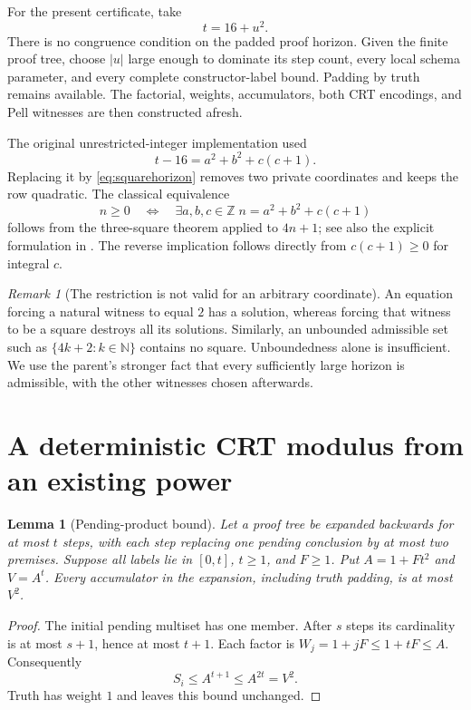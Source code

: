 \documentclass[11pt]{article}
\newcommand{\Z}{\mathbb Z}\newcommand{\N}{\mathbb N}
\newtheorem{lemma}[theorem]{Lemma}
\theoremstyle{definition}\newtheorem{definition}[theorem]{Definition}
\theoremstyle{remark}\newtheorem{remark}[theorem]{Remark}
\begin{document}
For the present certificate, take
\[
 t=16+u^2. \tag{6}\label{eq:squarehorizon}
\]
There is no congruence condition on the padded proof horizon. Given the finite
proof tree, choose $|u|$ large enough to dominate its step count, every local
schema parameter, and every complete constructor-label bound. Padding by
truth remains available. The factorial, weights, accumulators, both CRT
encodings, and Pell witnesses are then constructed afresh.

The original unrestricted-integer implementation used
\[
 t-16=a^2+b^2+c(c+1).
\]
Replacing it by \eqref{eq:squarehorizon} removes two private coordinates and
keeps the row quadratic. The classical equivalence
\[
 n\ge0\quad\Longleftrightarrow\quad
 \exists a,b,c\in\Z\;n=a^2+b^2+c(c+1)
 \tag{7}\label{eq:three}
\]
follows from the three-square theorem applied to $4n+1$; see also the explicit
formulation in \cite[Lemma 6.1]{bayer}. The reverse implication follows
directly from $c(c+1)\ge0$ for integral $c$.

\begin{remark}[The restriction is not valid for an arbitrary coordinate]
An equation forcing a natural witness to equal $2$ has a solution, whereas
forcing that witness to be a square destroys all its solutions. Similarly,
an unbounded admissible set such as $\{4k+2:k\in\N\}$ contains no square.
Unboundedness alone is insufficient. We use the parent's stronger fact that
every sufficiently large horizon is admissible, with the other witnesses
chosen afterwards.
\end{remark}

\section{A deterministic CRT modulus from an existing power}
\label{sec:modulus}

\begin{lemma}[Pending-product bound]
Let a proof tree be expanded backwards for at most $t$ steps, with each
step replacing one pending conclusion by at most two premises. Suppose all
labels lie in $[0,t]$, $t\ge1$, and $F\ge1$. Put
$A=1+Ft^2$ and $V=A^t$. Every accumulator in the expansion, including
truth padding, is at most $V^2$.
\end{lemma}
\begin{proof}
The initial pending multiset has one member. After $s$ steps its cardinality
is at most $s+1$, hence at most $t+1$. Each factor is
$W_j=1+jF\le1+tF\le A$. Consequently
\[
 S_i\le A^{t+1}\le A^{2t}=V^2.
\]
Truth has weight $1$ and leaves this bound unchanged.
\end{proof}
\end{document}
